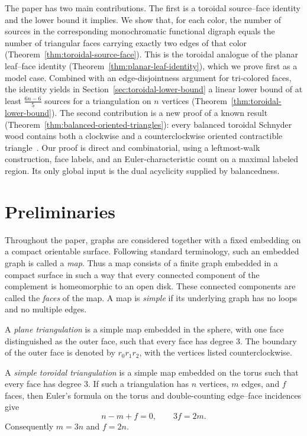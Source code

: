 \documentclass[11pt]{amsart}
\theoremstyle{plain}
\theoremstyle{definition}
\theoremstyle{remark}
\begin{document}
The paper has two main contributions. The first is a toroidal source--face identity and the lower bound it implies. We show that, for each color, the number of sources in the corresponding monochromatic functional digraph equals the number of triangular faces carrying exactly two edges of that color (Theorem~\ref{thm:toroidal-source-face}). This is the toroidal analogue of the planar leaf--face identity (Theorem~\ref{thm:planar-leaf-identity}), which we prove first as a model case. Combined with an edge-disjointness argument for tri-colored faces, the identity yields in Section~\ref{sec:toroidal-lower-bound} a linear lower bound of at least $\frac{6n-6}{5}$ sources for a triangulation on $n$ vertices (Theorem~\ref{thm:toroidal-lower-bound}). The second contribution is a new proof of a known result (Theorem~\ref{thm:balanced-oriented-triangles}): every balanced toroidal Schnyder wood contains both a clockwise and a counterclockwise oriented contractible triangle~\cite{despre-goncalves-leveque2017}. Our proof is direct and combinatorial, using a leftmost-walk construction, face labels, and an Euler-characteristic count on a maximal labeled region. Its only global input is the dual acyclicity supplied by balancedness.


\section{Preliminaries}
\label{sec:prelim}

Throughout the paper, graphs are considered together with a fixed embedding on a compact orientable surface. Following standard terminology, such an embedded graph is called a \emph{map}. Thus a map consists of a finite graph embedded in a compact surface in such a way that every connected component of the complement is homeomorphic to an open disk. These connected components are called the \emph{faces} of the map. A map is \emph{simple} if its underlying graph has no loops and no multiple edges.

A \emph{plane triangulation} is a simple map embedded in the sphere, with one face distinguished as the outer face, such that every face has degree $3$. The boundary of the outer face is denoted by $r_0 r_1 r_2$, with the vertices listed counterclockwise.

A \emph{simple toroidal triangulation} is a simple map embedded on the torus such that every face has degree $3$. If such a triangulation has $n$ vertices, $m$ edges, and $f$ faces, then Euler's formula on the torus and double-counting edge--face incidences give
\[
  n-m+f = 0, \qquad 3f = 2m.
\]
Consequently $m = 3n$ and $f = 2n$.
\end{document}
